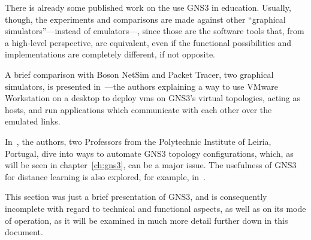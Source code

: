 There is already some published work on the use GNS3 in education.
Usually, though, the experiments and comparisons are made against other ``graphical simulators''---instead of emulators---, since those are the software tools that, from a high-level perspective, are equivalent, even if the functional possibilities and implementations are completely different, if not opposite.

A brief comparison with Boson NetSim and Packet Tracer, two graphical simulators, is presented in~\cite{virtlabgnsvmware}---the authors explaining a way to use VMware Workstation on a desktop to deploy \glspl{vm} on GNS3's virtual topologies, acting as hosts, and run applications which communicate with each other over the emulated links.

In~\cite{automaticnetconfiggns}, the authors, two Professors from the Polytechnic Institute of Leiria, Portugal, dive into ways to automate GNS3 topology configurations, which, as will be seen in chapter~\ref{ch:gns3}, can be a major issue.
The usefulness of GNS3 for distance learning is also explored, for example, in~\cite{networkvirtwithgns}.

This section was just a brief presentation of GNS3, and is consequently incomplete with regard to technical and functional aspects, as well as on its mode of operation, as it will be examined in much more detail further down in this document.

